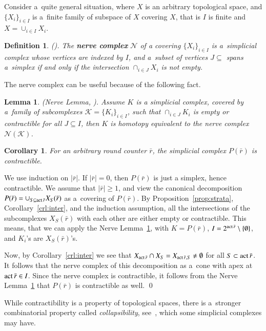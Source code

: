 \documentclass{amsart}[10pt]
\newtheorem{df}[theorem]{Definition}
\newtheorem{lm}[theorem]{Lemma}
\newtheorem{crl}[theorem]{Corollary}
\newcommand{\pr}{\nin{\bf Proof.} }
\newcommand{\act}{\text{\rm act}\,}
\newcommand{\ck}{{\mathcal K}}
\newcommand{\cn}{{\mathcal N}}
\newcommand{\es}{\emptyset}
\newcommand{\sm}{\setminus}
\newcommand{\tr}{{\bar r}}
\numberwithin{equation}{section}
\numberwithin{figure}{section}
\numberwithin{table}{section}
\begin{document}
Consider a~quite general situation, where $X$ is an arbitrary
topological space, and $\{X_i\}_{i\in I}$ is a~finite family of
subspace of $X$ covering $X$, that is $I$ is finite and $X=\cup_{i\in
  I}X_i$.

\begin{df}{\rm(\cite[Definition 15.14]{book}).}
The {\bf nerve complex} $\cn$ of a covering $\{X_i\}_{i\in I}$ is
a~simplicial complex whose vertices are indexed by $I$, and a~subset
of vertices $J\subseteq$ spans a~simplex if and only if the
intersection $\cap_{i\in J}X_i$ is not empty.
\end{df}

The nerve complex can be useful because of the following fact.
\begin{lm} \label{lm:nerve}
{\rm(Nerve Lemma, \cite[Theorem 15.21, Remark 15.22]{book}).}  Assume
$K$ is a simplicial complex, covered by a~family of subcomplexes
$\ck=\{K_i\}_{i\in I}$, such that $\cap_{i\in J}K_i$ is empty or
contractible for all $J\subseteq I$, then $K$ is homotopy equivalent
to the nerve complex $\cn(\ck)$.
\end{lm}

\begin{crl}
For an arbitrary round counter $\tr$, the simplicial complex $P(\tr)$
is contractible.
\end{crl}
\pr We use induction on $|\tr|$. If $|\tr|=0$, then $P(\tr)$ is just a
simplex, hence contractible. We assume that $|\tr|\geq 1$, and view
the canonical decomposition $P(\tr)=\cup_{S\subseteq\act\tr} X_S(\tr)$
as a~covering of $P(\tr)$.  By Proposition~\ref{prop:strata},
Corollary~\ref{crl:inter}, and the induction assumption, all the
intersections of the subcomplexes $X_S(\tr)$ with each other are
either empty or contractible. This means, that we can apply the Nerve
Lemma~\ref{lm:nerve}, with $K=P(\tr)$, $I=2^{\act\tr}\sm\{\es\}$, and
$K_i$'s are $X_S(\tr)$'s.

Now, by Corollary~\ref{crl:inter} we see that $X_{\act\tr}\cap
X_S=X_{\act\tr,S}\neq\es$ for all $S\subset\act\tr$. It follows that
the nerve complex of this decomposition as a~cone with apex at
$\act\tr\in I$. Since the nerve complex is contractible, it follows
from the Nerve Lemma~\ref{lm:nerve} that $P(\tr)$ is contractible as
well.  \qed

While contractibility is a property of topological spaces, there is
a~stronger combinatorial property called {\it collapsibility},
see~\cite{coh}, which some simplicial complexes may have.
\end{document}
